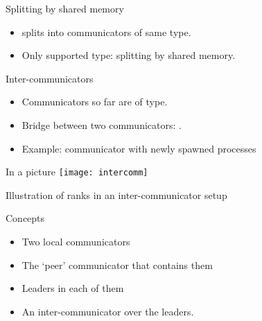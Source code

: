 \begin{exerciseframe}[procgrid]
  \footnotesize
  
\end{exerciseframe}

\begin{exerciseframe}
  
\end{exerciseframe}

\begin{numberedframe}{Splitting by shared memory}
  \begin{itemize}
  \item
     splits into communicators of same type.
  \item Only supported type:  splitting by
    shared memory.
  \end{itemize}

\end{numberedframe}

\begin{numberedframe}{Inter-communicators}
\label{sl:comm-inter}
  \begin{itemize}
  \item Communicators so far are of  type.
  \item Bridge between two communicators: .
  \item Example: communicator with newly spawned processes
  \end{itemize}  
\end{numberedframe}

\begin{numberedframe}{In a picture}
  \label{sl:intercomm-picture}
  \texttt{[image: intercomm]}

  Illustration of ranks in an inter-communicator setup
  \tiny{}
\end{numberedframe}

\begin{numberedframe}{Concepts}
  \label{sl:intercomm-concepts}
  \begin{itemize}
  \item Two local communicators
  \item The `peer' communicator that contains them
  \item Leaders in each of them
  \item An inter-communicator over the leaders.
  \end{itemize}
\end{numberedframe}

